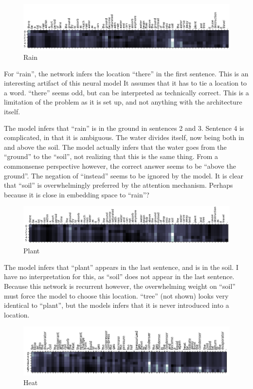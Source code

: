 \documentclass[11pt,a4paper]{article}
\begin{document}
\begin{figure}[h]
  \includegraphics[width=\linewidth]{images/rain.png}
  \caption{Rain}
  \label{fig:boat1}
\end{figure}

For “rain”, the network infers the location “there” in the first sentence. This is an interesting artifact of this neural model It assumes that it has to tie a location to a word. “there” seems odd, but can be interpreted as technically correct. This is a limitation of the problem as it is set up, and not anything with the architecture itself.

The model infers that “rain” is in the ground in sentences 2 and 3. Sentence 4 is complicated, in that it is ambiguous. The water divides itself, now being both in and above the soil. The model actually infers that the water goes from the “ground” to the “soil”, not realizing that this is the same thing. From a commonsense perspective however, the correct answer seems to be “above the ground”. The negation of “instead” seems to be ignored by the model. It is clear that “soil” is overwhelmingly preferred by the attention mechanism. Perhaps because it is close in embedding space to “rain”? 

\begin{figure}[h]
  \includegraphics[width=\linewidth]{images/plant.png}
  \caption{Plant}
  \label{fig:boat1}
\end{figure}

The model infers that “plant” appears in the last sentence, and is in the soil. I have no interpretation for this, as “soil” does not appear in the last sentence. Because this network is recurrent however, the overwhelming weight on “soil” must force the model to choose this location. “tree” (not shown) looks very identical to “plant”, but the models infers that it is never introduced into a location.

\begin{figure}[h]
  \includegraphics[width=\linewidth]{images/heat.png}
  \caption{Heat}
  \label{fig:boat1}
\end{figure}
\end{document}
